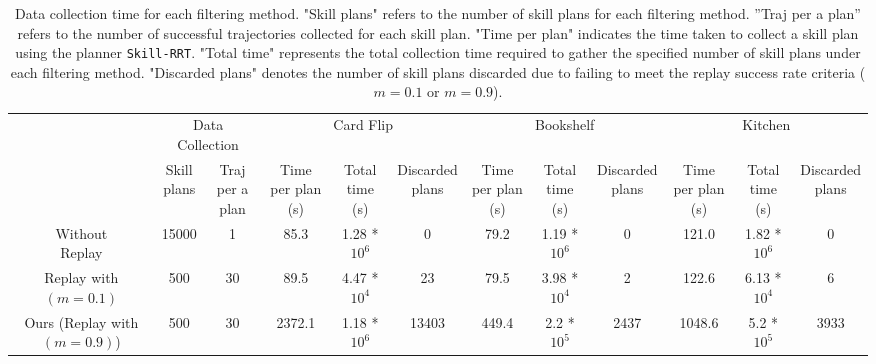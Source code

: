 \begin{table*}[ht]
\begin{adjustbox}{width=\columnwidth} %

\centering

\begin{tabular}{ccc|ccc|ccc|ccc}
    \toprule
    & \multicolumn{2}{c}{Data Collection} & \multicolumn{3}{c}{Card Flip} & \multicolumn{3}{c}{Bookshelf} & \multicolumn{3}{c}{Kitchen}   \\
    \cmidrule(lr){2-3} \cmidrule(lr){4-6}\cmidrule(lr){7-9}\cmidrule(lr){10-12}
    &  \makecell{Skill \\ plans} & \makecell{Traj \\ per a plan} & \makecell{Time \\ per plan (s)} & \makecell{Total \\ time (s)} & \makecell{Discarded \\ plans} &  \makecell{Time \\ per plan (s)} & \makecell{Total \\ time (s)} & \makecell{Discarded \\ plans}  & \makecell{Time \\ per plan (s)} & \makecell{Total \\ time (s)}& \makecell{Discarded \\ plans} \\
    \cmidrule(lr){1-1} \cmidrule(lr){2-3} \cmidrule(lr){4-6}\cmidrule(lr){7-9}\cmidrule(lr){10-12}
    \makecell{Without\\ Replay} 
    & 15000
    & 1
    & 85.3
    & 1.28 * $10^6$
    & 0
    & 79.2
    & 1.19 * $10^6$
    & 0
    & 121.0
    & 1.82 * $10^6$
    & 0
    \\
    \midrule
    \makecell{Replay \\with $(m=0.1)$} 
    & 500
    & 30
    & 89.5
    & 4.47 * $10^4$
    & 23
    & 79.5
    & 3.98 * $10^4$
    & 2
    & 122.6
    & 6.13 * $10^4$
    & 6
    \\
    \midrule
    \makecell{Ours (Replay\\ with $(m=0.9)$)} 
    & 500
    & 30
    & 2372.1
    & 1.18 * $10^6$
    & 13403
    & 449.4
    & 2.2 * $10^5$
    & 2437
    & 1048.6
    & 5.2 * $10^5$
    & 3933
    \\
    \bottomrule
\end{tabular}
\end{adjustbox}

\caption{Data collection time for each filtering method. "Skill plans" refers to the number of skill plans for each filtering method. ”Traj per a plan” refers to the number of successful trajectories collected for each skill plan. "Time per plan" indicates the time taken to collect a skill plan using the planner \texttt{Skill-RRT}. "Total time" represents the total collection time required to gather the specified number of skill plans under each filtering method. "Discarded plans" denotes the number of skill plans discarded due to failing to meet the replay success rate criteria (\( m = 0.1 \) or \( m = 0.9 \)).}
\label{table:ablation_dataQ_time}
\end{table*}
